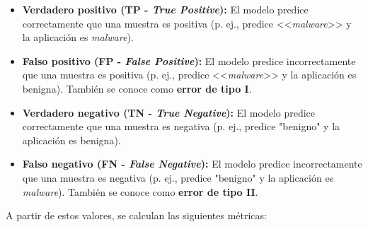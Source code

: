 \begin{itemize}
	\item \textbf{Verdadero positivo (TP - \textit{True Positive}):} El modelo predice correctamente que una muestra es positiva (p. ej., predice <<\textit{malware}>> y la aplicación es \textit{malware}).
	
	\item \textbf{Falso positivo (FP - \textit{False Positive}):} El modelo predice incorrectamente que una muestra es positiva (p. ej., predice <<\textit{malware}>> y la aplicación es benigna). También se conoce como \textbf{error de tipo I}.
	
	\item \textbf{Verdadero negativo (TN - \textit{True Negative}):} El modelo predice correctamente que una muestra es negativa (p. ej., predice "benigno" y la aplicación es benigna).
	
	\item \textbf{Falso negativo (FN - \textit{False Negative}):} El modelo predice incorrectamente que una muestra es negativa (p. ej., predice "benigno" y la aplicación es \textit{malware}). También se conoce como \textbf{error de tipo II}.
\end{itemize}

A partir de estos valores, se calculan las siguientes métricas:

